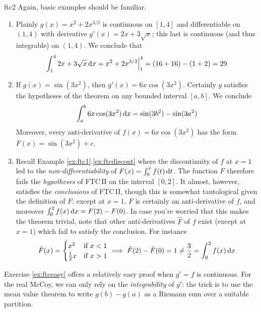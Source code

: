 \begin{examples}{}{ftc2}
	Again, basic examples should be familiar.
	\begin{enumerate}
	  \item Plainly $g(x)=x^2+2x^{3/2}$ is continuous on $[1,4]$ and differentiable on $(1,4)$ with derivative $g'(x)=2x+3\sqrt x$; this last is continuous (and thus integrable) on $(1,4)$. We conclude that
	  \[
	  	\int_1^42x+3\sqrt x\,{\mathrm{d} x} =x^2+2x^{3/2}\Big|_1^4 =(16+16)-(1+2)=29
	  \] 
	  
	  \item If $g(x)=\sin(3x^2)$, then $g'(x)=6x\cos(3x^2)$. Certainly $g$ satisfies the hypotheses of the theorem on any bounded interval $[a,b]$. We conclude
		\[
			\int_a^b 6x\cos(3x^2)\,{\mathrm{d} x}=\sin(3b^2)-\sin(3a^2)
		\]
		Moreover, every anti-derivative of $f(x)=6x\cos(3x^2)$ has the form $F(x)=\sin(3x^2)+c$.
		
		\item\label{ex:ftcdiscont2} Recall Example \ref*{ex:ftc1}.\ref{ex:ftcdiscont} where the discontinuity of $f$ at $x=1$ led to the \emph{non-differentiability} of $F(x)=\int_0^xf(t)\,{\mathrm{d} t}$. The function $F$ therefore fails the \emph{hypotheses} of FTC\,II on the interval $[0,2]$.\smallbreak
		It almost, however, satisfies the \emph{conclusions} of FTC\,II, though this is somewhat tautological given the definition of $F$: except at $x=1$, $F$ is certainly an anti-derivative of $f$, and moreover $\int_0^2f(x)\,{\mathrm{d} x}=F(2)-F(0)$.\smallbreak
		In case you're worried that this makes the theorem trivial, note that other anti-derivatives $\hat F$ of $f$ exist (except at $x=1$) which fail to satisfy the conclusion. For instance
		\[
			\hat F(x)=
			\begin{cases}
		  	x^2&\text{if }x<1\\
		  	\frac 12x&\text{if }x>1
		  \end{cases}
		  \implies \hat F(2)-\hat F(0)=1\neq \frac 32=\int_0^2f(x)\,{\mathrm{d} x}
		\]
	\end{enumerate}
\end{examples}


\goodbreak



Exercise \ref{ex:ftceasy} offers a relatively easy proof when $g'=f$ is continuous. For the real McCoy, we can only rely on the \emph{integrability} of $g'$: the trick is to use the mean value theorem to write $g(b)-g(a)$ as a Riemann sum over a suitable partition.

